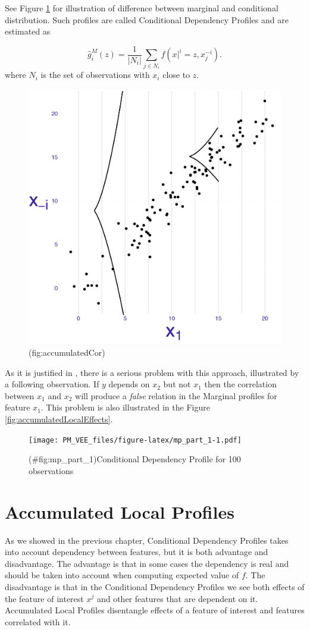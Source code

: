 \documentclass[12pt,]{krantz}
\begin{document}
See Figure \ref{fig:accumulatedCor} for illustration of difference between marginal and conditional distribution. Such profiles are called Conditional Dependency Profiles and are estimated as

\[
\hat g^{M}_i(z) = \frac{1}{|N_i|} \sum_{j\in N_i} f(x|^i = z, x_j^{-i}). 
\]
where \(N_i\) is the set of observations with \(x_i\) close to \(z\).

\begin{figure}

{\centering \includegraphics[width=0.4\linewidth]{figure/CP_ALE_2} 

}

\caption{(fig:accumulatedCor) }\label{fig:accumulatedCor}
\end{figure}

As it is justified in \citep{R-ALEPlot}, there is a serious problem with this approach, illustrated by a following observation. If \(y\) depends on \(x_2\) but not \(x_1\)
then the correlation between \(x_1\) and \(x_2\)
will produce a \emph{false} relation in the Marginal profiles for feature \(x_1\). This problem is also illustrated in the Figure \ref{fig:accumulatedLocalEffects}.

\begin{figure}
\centering
\texttt{[image: PM\_VEE\_files/figure-latex/mp\_part\_1-1.pdf]}
\caption{(\#fig:mp\_part\_1)Conditional Dependency Profile for 100 observations}
\end{figure}

\hypertarget{accumulatedLocalProfiles}{%
\section{Accumulated Local Profiles}\label{accumulatedLocalProfiles}}

As we showed in the previous chapter, Conditional Dependency Profiles takes into account dependency between features, but it is both advantage and disadvantage. The advantage is that in some cases the dependency is real and should be taken into account when computing expected value of \(f\). The disadvantage is that in the Conditional Dependency Profiles we see both effects of the feature of interest \(x^j\) and other features that are dependent on it. Accumulated Local Profiles disentangle effects of a feature of interest and features correlated with it.
\end{document}
